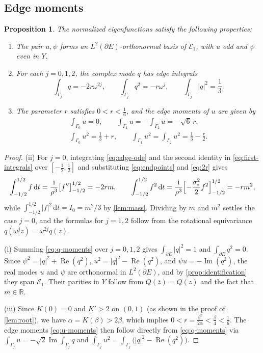 \documentclass[11pt,reqno]{amsart}
\numberwithin{equation}{section}
\newtheorem{proposition}[proposition]{Proposition}
\theoremstyle{remark}
\newcommand{\R}{\mathbb R}
\newcommand{\dd}{\,\mathrm d}
\newcommand{\ii}{\mathrm i}
\newcommand{\om}{\omega}
\DeclareMathOperator{\Rea}{Re}
\DeclareMathOperator{\Ima}{Im}
\begin{document}
\subsection{Edge moments}
\begin{proposition}\label{prop:edge-moments}
The normalized eigenfunctions satisfy the following properties:
\begin{enumerate}
\item[(i)] The pair $u,\psi$ forms an $L^2(\partial E)$-orthonormal basis of
$\mathcal E_1$, with $u$ odd and $\psi$ even in $Y$.
\item[(ii)] For each $j=0,1,2$, the complex mode $q$ has edge integrals
\begin{equation}\label{eq:q-moments}
 \int_{\Gamma_j}q=-2r\om^{2j},\qquad
 \int_{\Gamma_j}q^2=-r\om^{j},\qquad
 \int_{\Gamma_j}|q|^2=\frac13 .
\end{equation}
\item[(iii)] The parameter $r$ satisfies $0<r<\frac16$, and the edge moments of
$u$ are given by
\begin{equation}\label{eq:u-moments}
 \begin{gathered}
 \int_{\Gamma_0}u=0,\qquad \int_{\Gamma_1}u=-\int_{\Gamma_2}u=-\sqrt6\,r,\\
 \int_{\Gamma_0}u^2=\frac13+r,\qquad
 \int_{\Gamma_1}u^2=\int_{\Gamma_2}u^2=\frac13-\frac r2 .
 \end{gathered}
\end{equation}
\end{enumerate}
\end{proposition}
\begin{proof}
(ii) For $j=0$, integrating \eqref{eq:edge-ode} and the second identity in
\eqref{eq:first-integrals} over $[-\frac12,\frac12]$ and substituting
\eqref{eq:endpoints} and \eqref{eq:2r} gives
\[
 \int_{-1/2}^{1/2}f\dd t=\frac{\ii}{\rho^3}\bigl[f''\bigr]_{-1/2}^{1/2}=-2rm,
 \qquad
 \int_{-1/2}^{1/2}f^2\dd t
 =\frac{\ii}{\rho^3}\Bigl[-\frac{\sigma_*^2}2f^2\Bigr]_{-1/2}^{1/2}=-rm^2,
\]
while $\int_{-1/2}^{1/2}|f|^2\dd t=I_0=m^2/3$ by \cref{lem:mass}. Dividing by $m$
and $m^2$ settles the case $j=0$, and the formulas for $j=1,2$ follow from the
rotational equivariance $q(\om^jz)=\om^{2j}q(z)$.

(i) Summing \eqref{eq:q-moments} over $j=0,1,2$ gives $\int_{\partial E}|q|^2=1$
and $\int_{\partial E}q^2=0$. Since $\psi^2=|q|^2+\Rea(q^2)$,
$u^2=|q|^2-\Rea(q^2)$, and $\psi u=-\Ima(q^2)$, the real modes $u$ and $\psi$ are
orthonormal in $L^2(\partial E)$, and by \cref{prop:identification} they span
$\mathcal E_1$. Their parities in $Y$ follow from $Q(\overline z)=\overline{Q(z)}$
and the fact that $m\in\R$.

(iii) Since $K(0)=0$ and $K'>2$ on $(0,1)$ (as shown in the proof of
\cref{lem:root}), we have $\alpha=K(\beta)>2\beta$, which implies
$0<r=\frac{\beta^2}{2\alpha}<\frac\beta4<\frac16$. The edge moments
\eqref{eq:u-moments} then follow directly from \eqref{eq:q-moments} via
$\int_{\Gamma_j}u=-\sqrt2\Ima\int_{\Gamma_j}q$ and
$\int_{\Gamma_j}u^2=\int_{\Gamma_j}\bigl(|q|^2-\Rea(q^2)\bigr)$.
\end{proof}
\end{document}
